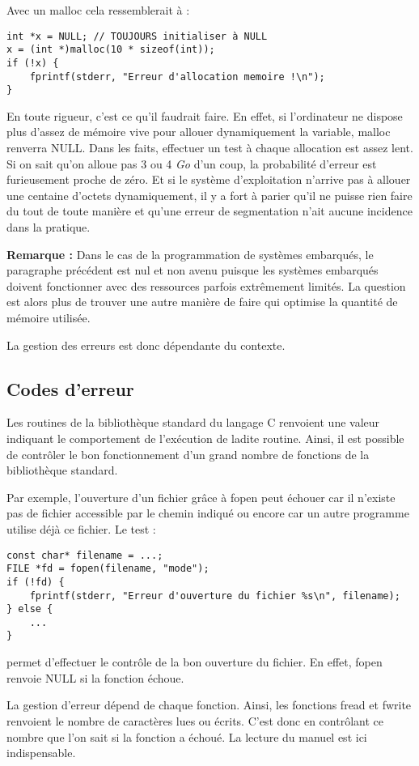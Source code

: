 \documentclass[../../../main.tex]{subfiles}
\begin{document}
Avec un malloc cela ressemblerait à :
\begin{verbatim}
int *x = NULL; // TOUJOURS initialiser à NULL
x = (int *)malloc(10 * sizeof(int));
if (!x) {
	fprintf(stderr, "Erreur d'allocation memoire !\n");
}
\end{verbatim}
En toute rigueur, c'est ce qu'il faudrait faire. En effet, si l'ordinateur ne dispose plus d'assez de mémoire vive pour allouer dynamiquement la variable, \textsf{malloc} renverra \textsf{NULL}. Dans les faits, effectuer un test à
chaque allocation est assez lent. Si on sait qu'on alloue pas 3 ou 4 \textit{Go} d'un coup, la probabilité d'erreur est furieusement proche de zéro. Et si le système d'exploitation n'arrive pas à allouer une centaine d'octets dynamiquement, il y a fort à parier qu'il ne puisse rien faire du tout de toute manière et qu'une erreur de segmentation n'ait aucune incidence dans la pratique.

\textbf{Remarque :} Dans le cas de la programmation de systèmes embarqués, le paragraphe précédent est nul et non avenu puisque les systèmes embarqués doivent fonctionner avec des ressources parfois extrêmement limités. La question est alors plus de trouver une autre manière de faire qui optimise la
quantité de mémoire utilisée.

La gestion des erreurs est donc dépendante du contexte.
\subsection{Codes d'erreur}
Les routines de la bibliothèque standard du langage C renvoient une valeur indiquant le comportement
de l'exécution de ladite routine. Ainsi, il est possible de contrôler le bon fonctionnement d'un grand nombre de fonctions de la bibliothèque standard.

Par exemple, l'ouverture d'un fichier grâce à \textsf{fopen} peut échouer car il n'existe pas de fichier accessible
par le chemin indiqué ou encore car un autre programme utilise déjà ce fichier. Le test :
\begin{verbatim}
const char* filename = ...;
FILE *fd = fopen(filename, "mode");
if (!fd) {
	fprintf(stderr, "Erreur d'ouverture du fichier %s\n", filename);
} else {
	...
}
\end{verbatim}
permet d'effectuer le contrôle de la bon ouverture du fichier. En effet, \textsf{fopen} renvoie \textsf{NULL} si la fonction
échoue.

La gestion d'erreur dépend de chaque fonction. Ainsi, les fonctions \textsf{fread} et \textsf{fwrite} renvoient le nombre
de caractères lues ou écrits. C'est donc en contrôlant ce nombre que l'on sait si la fonction a échoué.
La lecture du manuel est ici indispensable.
\end{document}
